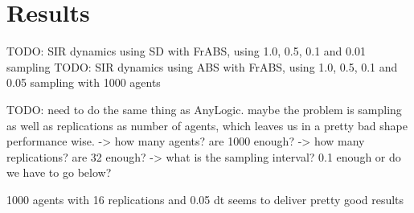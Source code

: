 \section{Results}
TODO: SIR dynamics using SD with FrABS, using 1.0, 0.5, 0.1 and 0.01 sampling 
TODO: SIR dynamics using ABS with FrABS, using 1.0, 0.5, 0.1 and 0.05 sampling with 1000 agents

TODO: need to do the same thing as AnyLogic. maybe the problem is sampling as well as replications as number of agents, which leaves us in a pretty bad shape performance wise.
	-> how many agents? are 1000 enough?
	-> how many replications? are 32 enough?
	-> what is the sampling interval? 0.1 enough or do we have to go below?
	
	1000 agents with 16 replications and 0.05 dt seems to deliver pretty good results